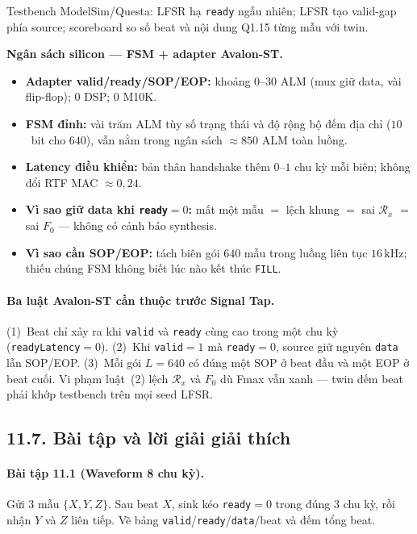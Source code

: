 Testbench ModelSim/Questa: LFSR hạ \texttt{ready} ngẫu nhiên; LFSR tạo valid-gap phía source; scoreboard so số beat và nội dung Q1.15 từng mẫu với twin.

\begin{costbox}
\textbf{Ngân sách silicon --- FSM + adapter Avalon-ST.}
\begin{itemize}[leftmargin=1.2em]
    \item \textbf{Adapter valid/ready/SOP/EOP:} khoảng $0$--$30$ ALM (mux giữ data, vài flip-flop); $0$ DSP; $0$ M10K.
    \item \textbf{FSM đỉnh:} vài trăm ALM tùy số trạng thái và độ rộng bộ đếm địa chỉ ($10$~bit cho $640$), vẫn nằm trong ngân sách $\approx 850$ ALM toàn luồng.
    \item \textbf{Latency điều khiển:} bản thân handshake thêm $0$--$1$ chu kỳ mỗi biên; không đổi RTF MAC $\approx 0{,}24$.
    \item \textbf{Vì sao giữ data khi \texttt{ready}$=0$:} mất một mẫu $= $ lệch khung $= $ sai $\mathcal{R}_x$ $= $ sai $F_0$ --- không có cảnh báo synthesis.
    \item \textbf{Vì sao cần SOP/EOP:} tách biên gói $640$ mẫu trong luồng liên tục $16\,\text{kHz}$; thiếu chúng FSM không biết lúc nào kết thúc \texttt{FILL}.
\end{itemize}
\end{costbox}

\paragraph{Ba luật Avalon-ST cần thuộc trước Signal Tap.}
(1)~Beat chỉ xảy ra khi \texttt{valid} và \texttt{ready} cùng cao trong một chu kỳ (\texttt{readyLatency}$=0$).
(2)~Khi \texttt{valid}$=1$ mà \texttt{ready}$=0$, source giữ nguyên \texttt{data} lẫn SOP/EOP.
(3)~Mỗi gói $L=640$ có đúng một SOP ở beat đầu và một EOP ở beat cuối.
Vi phạm luật~(2) lệch $\mathcal{R}_x$ và $F_0$ dù Fmax vẫn xanh --- twin đếm beat phải khớp testbench trên mọi seed LFSR.

\subsection*{11.7. Bài tập và lời giải giải thích}

\paragraph{Bài tập 11.1 (Waveform 8 chu kỳ).}
Gửi $3$ mẫu $\{X,Y,Z\}$. Sau beat $X$, sink kéo \texttt{ready}$=0$ trong đúng $3$ chu kỳ, rồi nhận $Y$ và $Z$ liên tiếp. Vẽ bảng \texttt{valid}/\texttt{ready}/\texttt{data}/beat và đếm tổng beat.

